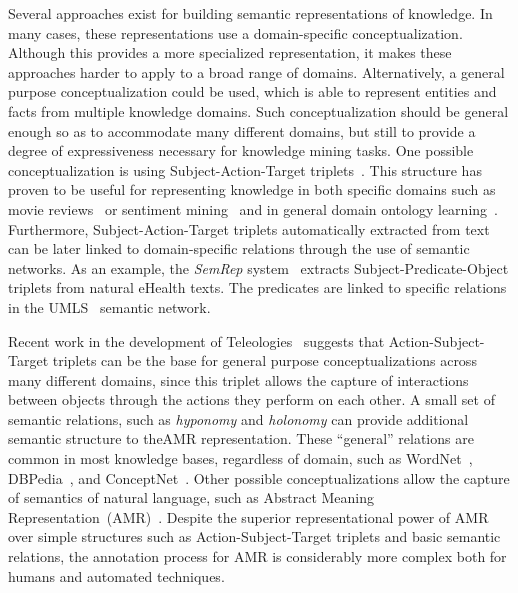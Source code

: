 Several approaches exist for building semantic representations of knowledge.
In many cases, these representations use a domain-specific conceptualization.
Although this provides a more specialized representation, it makes these approaches harder to apply to a broad range of domains.
Alternatively, a general purpose conceptualization could be used, which is able to represent entities and facts from multiple knowledge domains.
Such conceptualization should be general enough so as to accommodate many different domains, but still to provide a degree of expressiveness necessary for knowledge mining tasks.
One possible conceptualization is using
{Subject-Action-Target triplets}~\cite{suilan2018}.
This structure has proven to be useful for representing knowledge in both specific
domains such as movie reviews~\cite{suilan2018} or sentiment
mining~\cite{emotinet} and in {general domain ontology learning}~\cite{mitchell2018never}. %
Furthermore, Subject-Action-Target triplets automatically extracted from text can be
later linked to domain-specific relations through the use of semantic networks.
As an example, the \textit{SemRep} system~\cite{semrep} extracts Subject-Predicate-Object
triplets from natural eHealth texts. The predicates are linked to specific relations
in the UMLS~\cite{umls} semantic network.

Recent work in the development of Teleologies~\cite{teleologies} suggests that Action-Subject-Target triplets can be the base for general purpose conceptualizations across many different domains, since this triplet allows the capture of interactions between objects through the actions they perform on each other.
A small set of semantic relations, such as \textit{hyponomy} and
\textit{holonomy} can provide additional semantic structure to theAMR
representation. These ``general'' relations are common in most knowledge bases,
regardless of domain, such as WordNet~\cite{miller1998wordnet},
DBPedia~\cite{lehmann2015dbpedia}, and ConceptNet~\cite{conceptnet}.
Other possible conceptualizations allow the capture of semantics of natural language,
such as Abstract Meaning Representation~(AMR)~\cite{amr}. Despite the superior representational
power of AMR over simple structures such as Action-Subject-Target triplets {and basic semantic
relations}, the annotation process for AMR is considerably more complex both for humans and automated techniques.

